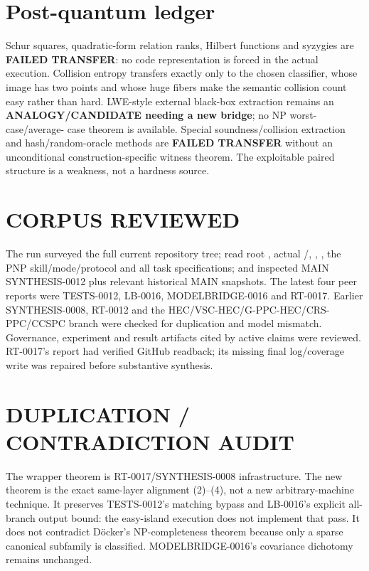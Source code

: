 \documentclass[11pt]{article}
\begin{document}
\section{Post-quantum ledger}

Schur squares, quadratic-form relation ranks, Hilbert functions and syzygies
are \textbf{FAILED TRANSFER}: no code representation is forced in the actual
execution.  Collision entropy transfers exactly only to the chosen classifier,
whose image has two points and whose huge fibers make the semantic collision
count easy rather than hard.  LWE-style external black-box extraction remains
an \textbf{ANALOGY/CANDIDATE needing a new bridge}; no NP worst-case/average-
case theorem is available.  Special soundness/collision extraction and
hash/random-oracle methods are \textbf{FAILED TRANSFER} without an
unconditional construction-specific witness theorem.  The exploitable paired
structure is a weakness, not a hardness source.

\section{CORPUS REVIEWED}

The run surveyed the full current repository tree; read root ,
actual /, , ,
the PNP skill/mode/protocol and all task specifications; and inspected MAIN
SYNTHESIS-0012 plus relevant historical MAIN snapshots.  The latest four peer
reports were TESTS-0012, LB-0016, MODELBRIDGE-0016 and RT-0017.  Earlier
SYNTHESIS-0008, RT-0012 and the HEC/VSC-HEC/G-PPC-HEC/CRS-PPC/CCSPC branch
were checked for duplication and model mismatch.  Governance, experiment and
result artifacts cited by active claims were reviewed.  RT-0017's report had
verified GitHub readback; its missing final log/coverage write was repaired
before substantive synthesis.

\section{DUPLICATION / CONTRADICTION AUDIT}

The wrapper theorem is RT-0017/SYNTHESIS-0008 infrastructure.  The new theorem
is the exact same-layer alignment (2)--(4), not a new arbitrary-machine
technique.  It preserves TESTS-0012's matching bypass and LB-0016's explicit
all-branch output bound: the easy-island execution does not implement that
pass.  It does not contradict D\"ocker's NP-completeness theorem because only
a sparse canonical subfamily is classified.  MODELBRIDGE-0016's covariance
dichotomy remains unchanged.
\end{document}
